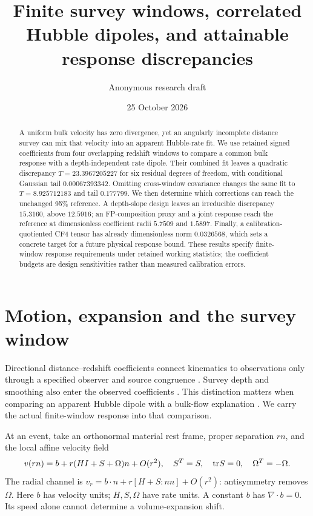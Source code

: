 \documentclass[aps,prd,reprint,onecolumn,superscriptaddress,nofootinbib]{revtex4-2}
\begin{document}
\title{Finite survey windows, correlated Hubble dipoles, and attainable response discrepancies}
\author{Anonymous research draft}
\noaffiliation
\date{25 October 2026}
\begin{abstract}
A uniform bulk velocity has zero divergence, yet an angularly incomplete distance survey can mix that velocity into an apparent Hubble-rate fit. We use retained signed coefficients from four overlapping redshift windows to compare a common bulk response with a depth-independent rate dipole. Their combined fit leaves a quadratic discrepancy $T=23.3967205227$ for six residual degrees of freedom, with conditional Gaussian tail $0.00067393342$. Omitting cross-window covariance changes the same fit to $T=8.925712183$ and tail $0.177799$. We then determine which corrections can reach the unchanged 95\% reference. A depth-slope design leaves an irreducible discrepancy $15.3160$, above $12.5916$; an FP-composition proxy and a joint response reach the reference at dimensionless coefficient radii $5.7509$ and $1.5897$. Finally, a calibration-quotiented CF4 tensor has already dimensionless norm $0.0326568$, which sets a concrete target for a future physical response bound. These results specify finite-window response requirements under retained working statistics; the coefficient budgets are design sensitivities rather than measured calibration errors.
\end{abstract}
\maketitle


\section{Motion, expansion and the survey window}
Directional distance--redshift coefficients connect kinematics to observations only through a specified observer and source congruence \cite{heinesen,maartens}. Survey depth and smoothing also enter the observed coefficients \cite{adamek}. This distinction matters when comparing an apparent Hubble dipole with a bulk-flow explanation \cite{boubel}. We carry the actual finite-window response into that comparison.

At an event, take an orthonormal material rest frame, proper separation $r n$, and the local affine velocity field
\begin{equation}
 v(rn)=b+r(HI+S+\Omega)n+O(r^2),\quad S^T=S,\quad {\rm tr}S=0,\quad\Omega^T=-\Omega.
\end{equation}
The radial channel is $v_r=b\cdot n+r[H+S:nn]+O(r^2)$: antisymmetry removes $\Omega$. Here $b$ has velocity units; $H,S,\Omega$ have rate units. A constant $b$ has $\nabla\cdot b=0$. Its speed alone cannot determine a volume-expansion shift.
\end{document}
